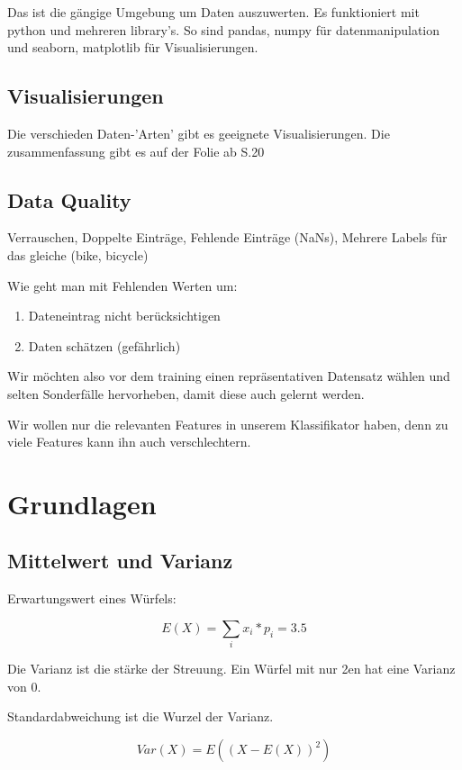 \documentclass[a4paper]{article}
\begin{document}
Das ist die gängige Umgebung um Daten auszuwerten. Es funktioniert mit python und mehreren library's. So sind pandas, numpy für datenmanipulation und seaborn, matplotlib für Visualisierungen.

\subsection{Visualisierungen}

Die verschieden Daten-'Arten' gibt es geeignete Visualisierungen. Die zusammenfassung gibt es auf der Folie ab S.20

\subsection{Data Quality}

Verrauschen, Doppelte Einträge, Fehlende Einträge (NaNs), Mehrere Labels für das gleiche (bike, bicycle)

Wie geht man mit Fehlenden Werten um:

\begin{enumerate}
    \item Dateneintrag nicht berücksichtigen
    \item Daten schätzen (gefährlich)
\end{enumerate}

Wir möchten also vor dem training einen repräsentativen Datensatz wählen und selten Sonderfälle hervorheben, damit diese auch gelernt werden. 

Wir wollen nur die relevanten Features in unserem Klassifikator haben, denn zu viele Features kann ihn auch verschlechtern.

\section{Grundlagen}

\subsection{Mittelwert und Varianz}

Erwartungswert eines Würfels:

\[
E(X) = \sum_{i} x_i*p_i = 3.5
\]

Die Varianz ist die stärke der Streuung. Ein Würfel mit nur 2en hat eine Varianz von 0.

Standardabweichung ist die Wurzel der Varianz.

\[
Var(X) = E((X - E(X))^2)
\]
\end{document}
